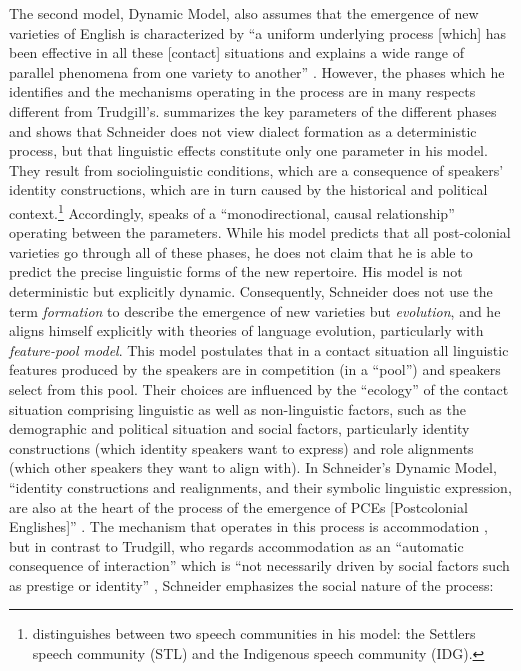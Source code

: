 The second model,  Dynamic Model, also assumes that the emergence of new varieties of English is characterized by “a uniform underlying process [which] has been effective in all these [contact] situations and explains a wide range of parallel phenomena from one variety to another” \citep[4]{Schneider2007}. However, the phases which he identifies and the mechanisms operating in the process are in many respects different from Trudgill’s.  summarizes the key parameters of the different phases and shows that Schneider does not view dialect formation as a deterministic process, but that linguistic effects constitute only one parameter in his model. They result from sociolinguistic conditions, which are a consequence of speakers’ identity constructions, which are in turn caused by the historical and political context.\footnote{\citet{Schneider2007} distinguishes between two speech communities in his model: the Settlers speech community (STL) and the Indigenous speech community (IDG).} Accordingly, \citet[30]{Schneider2007} speaks of a “monodirectional, causal relationship” operating between the parameters. While his model predicts that all post-colonial varieties go through all of these phases, he does not claim that he is able to predict the precise linguistic forms of the new repertoire. His model is not deterministic but explicitly dynamic. Consequently, Schneider does not use the term \textit{formation} to describe the emergence of new varieties but \textit{evolution}, and he aligns himself explicitly with theories of language evolution, particularly with  \textit{feature-pool model}. This model postulates that in a contact situation all linguistic features produced by the speakers are in competition (in a “pool”) and speakers select from this pool. Their choices are influenced by the “ecology” of the contact situation comprising linguistic as well as non-linguistic factors, such as the demographic and political situation and social factors, particularly identity constructions (which identity speakers want to express) and role alignments (which other speakers they want to align with). In Schneider’s Dynamic Model, “identity constructions and realignments, and their symbolic linguistic expression, are also at the heart of the process of the emergence of PCEs [Postcolonial Englishes]” \citep[28]{Schneider2007}. The mechanism that operates in this process is accommodation \citep{Giles1984}, but in contrast to Trudgill, who regards accommodation as an “automatic consequence of interaction” which is “not necessarily driven by social factors such as prestige or identity” \citep[28]{Trudgill2004}, Schneider emphasizes the social nature of the process:

